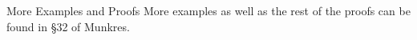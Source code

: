 \begin{remarkBox}{More Examples and Proofs}
    More examples as well as the rest of the proofs can be found in \S 32 of Munkres.
\end{remarkBox}